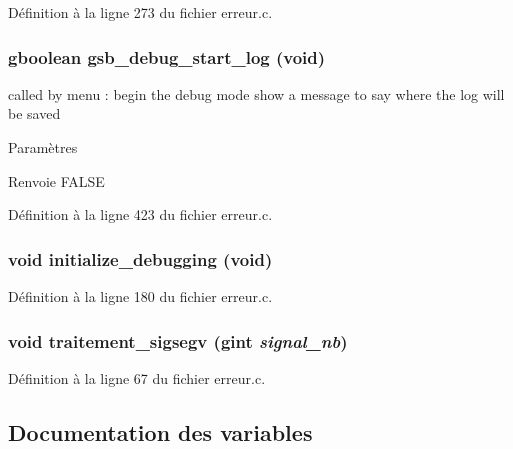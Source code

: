 Définition à la ligne 273 du fichier erreur.c.

\subsubsection[{gsb\_\-debug\_\-start\_\-log}]{\setlength{\rightskip}{0pt plus 5cm}gboolean gsb\_\-debug\_\-start\_\-log (void)}\label{erreur_8c_a8321053275e249fd34c4890aec24ab1e}
called by menu : begin the debug mode show a message to say where the log will be saved


\begin{DoxyParams}{Paramètres}
\item[{\em }]\end{DoxyParams}
\begin{DoxyReturn}{Renvoie}
FALSE 
\end{DoxyReturn}


Définition à la ligne 423 du fichier erreur.c.

\subsubsection[{initialize\_\-debugging}]{\setlength{\rightskip}{0pt plus 5cm}void initialize\_\-debugging (void)}\label{erreur_8c_ab6d5eff68f3c78505c67b358955c3e85}


Définition à la ligne 180 du fichier erreur.c.

\subsubsection[{traitement\_\-sigsegv}]{\setlength{\rightskip}{0pt plus 5cm}void traitement\_\-sigsegv (gint {\em signal\_\-nb})}\label{erreur_8c_aac06461c37298dba178aed1b0c3fde98}


Définition à la ligne 67 du fichier erreur.c.



\subsection{Documentation des variables}
